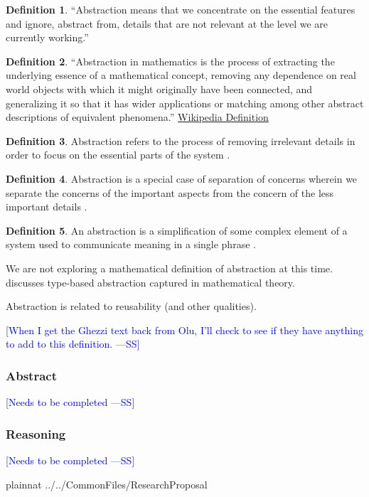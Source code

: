 \documentclass[letterpaper, cleveref]{lipics-v2019}
\newcommand{\authornote}[3]{\textcolor{#1}{[#3 ---#2]}}
\newcommand{\authornote}[3]{}
\newcommand{\wss}[1]{\authornote{blue}{SS}{#1}} %
\theoremstyle{definition}
\newtheorem{defn}{Definition}
\begin{document}
\begin{defn}
  ``Abstraction means that we concentrate on the essential features and ignore,
  abstract from, details that are not relevant at the level we are currently
  working.''  \citep[p.\ 296]{VanVliet2000}
\end{defn}

\begin{defn}
  ``Abstraction in mathematics is the process of extracting the underlying
  essence of a mathematical concept, removing any dependence on real world
  objects with which it might originally have been connected, and generalizing
  it so that it has wider applications or matching among other abstract
  descriptions of equivalent phenomena.''
  \href{https://en.wikipedia.org/wiki/Abstraction_(mathematics)} {Wikipedia
    Definition}
\end{defn}

\begin{defn}
Abstraction refers to the process of removing irrelevant details in order to focus on the essential parts of the system \citep{filipovikj2017pattern}.
\end{defn}	

\begin{defn}
Abstraction is a special case of separation of concerns wherein we separate the concerns of the important aspects from the concern of the less important details \citep{GhezziEtAl2003}.
\end{defn}

\begin{defn}
An abstraction is a simplification of some complex element of a system used to communicate meaning in a single phrase \citep{roger2015software}.
\end{defn}

We are not exploring a mathematical definition of abstraction at this time. \cite{reynolds1983types} discusses type-based abstraction captured in mathematical theory.

Abstraction is related to reusability (and other qualities).

\wss{When I get the Ghezzi text back from Olu, I'll check to see if they have
  anything to add to this definition.}

\begin{mybox}
\subsubsection*{Abstract} 
\wss{Needs to be completed}
\end{mybox}

\subsubsection*{Reasoning}

\wss{Needs to be completed}


\newpage

 {plainnat}
 {../../CommonFiles/ResearchProposal}
\end{document}
